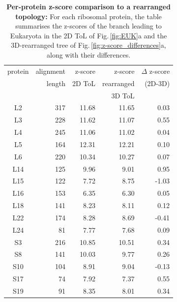 \begin{appendices}
\begin{table}[ht]
    \centering
    \begin{tabular}{|c|r|r|r|r|}
\hline
protein& alignment& z-score & z-score& $\Delta$ z-score\\
&length& 2D ToL & rearranged & (2D-3D)\\
&& & 3D ToL & \\
\hline
L2&317&11.68&11.65& 0.03\\
L3&228&11.62&11.07& 0.55\\
L4&245&11.06&11.02& 0.04\\
L5&164&12.31&12.21& 0.10\\
L6&220&10.34&10.27& 0.07\\
L14&125&9.96&9.01& 0.95\\
L15&122&7.72&8.75& -1.03\\
L16&153&6.35&6.30& 0.05\\
L18&141&8.23&8.11& 0.12\\
L22&174&8.28&8.69& -0.41\\
L24&81&7.77&7.68& 0.09\\
S3&216&10.85&10.51& 0.34\\
S8&141&10.03&9.77& 0.26\\
S10&104&8.91&9.04& -0.13\\
S17&74&7.92&7.37& 0.55\\
S19&91&8.35&8.01& 0.34\\
\hline
    \end{tabular}
    \vspace{0.25cm}
    \caption{\textbf{Per-protein z-score comparison to a rearranged topology:} For each ribosomal protein, the table summarises the z-scores of the branch leading to Eukaryota in the 2D ToL of Fig.\,\ref{fig:EUK}a and the 3D-rearranged tree of Fig.\,\ref{fig:z-score_differences}a, along with their differences. %
    }
    \label{supptab:protein_2D_3D}
    \end{table}


\end{appendices}
